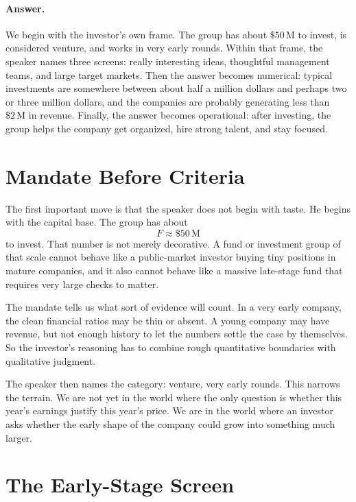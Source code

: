 \paragraph{Answer.}
We begin with the investor's own frame. The group has about \( \$50\,\text{M} \) to invest, is considered venture, and works in very early rounds. Within that frame, the speaker names three screens: really interesting ideas, thoughtful management teams, and large target markets. Then the answer becomes numerical: typical investments are somewhere between about half a million dollars and perhaps two or three million dollars, and the companies are probably generating less than \( \$2\,\text{M} \) in revenue. Finally, the answer becomes operational: after investing, the group helps the company get organized, hire strong talent, and stay focused.

\section{Mandate Before Criteria}

The first important move is that the speaker does not begin with taste. He begins with the capital base. The group has about
\begin{equation}
F \approx \$50\,\text{M}
\end{equation}
to invest. That number is not merely decorative. A fund or investment group of that scale cannot behave like a public-market investor buying tiny positions in mature companies, and it also cannot behave like a massive late-stage fund that requires very large checks to matter.

The mandate tells us what sort of evidence will count. In a very early company, the clean financial ratios may be thin or absent. A young company may have revenue, but not enough history to let the numbers settle the case by themselves. So the investor's reasoning has to combine rough quantitative boundaries with qualitative judgment.

The speaker then names the category: venture, very early rounds. This narrows the terrain. We are not yet in the world where the only question is whether this year's earnings justify this year's price. We are in the world where an investor asks whether the early shape of the company could grow into something much larger.

\section{The Early-Stage Screen}

